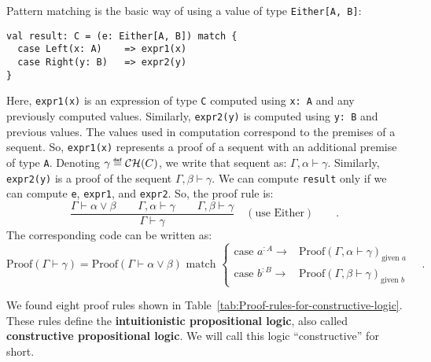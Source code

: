 Pattern matching is the basic way of using a value of type \lstinline!Either[A, B]!:
\begin{lstlisting}
val result: C = (e: Either[A, B]) match {
  case Left(x: A)    => expr1(x)
  case Right(y: B)   => expr2(y)
}
\end{lstlisting}
Here, \lstinline!expr1(x)! is an expression of type \lstinline!C!
computed using \lstinline!x: A! and any previously computed values.
Similarly, \lstinline!expr2(y)! is computed using \lstinline!y: B!
and previous values. The values used in computation correspond to
the premises of a sequent. So, \lstinline!expr1(x)! represents a
proof of a sequent with an additional premise of type \lstinline!A!.
Denoting $\gamma\triangleq{\cal CH}(C)$, we write that sequent as:
$\Gamma,\alpha\vdash\gamma$. Similarly, \lstinline!expr2(y)! is
a proof of the sequent $\Gamma,\beta\vdash\gamma$. We can compute
\lstinline!result! only if we can compute \lstinline!e!, \lstinline!expr1!,
and \lstinline!expr2!. So, the proof rule is: 
\[
\frac{\Gamma\vdash\alpha\vee\beta\quad\quad\Gamma,\alpha\vdash\gamma\quad\quad\Gamma,\beta\vdash\gamma}{\Gamma\vdash\gamma}\quad(\text{use Either})\quad\quad.
\]
The corresponding code can be written as:
\[
\text{Proof}\left(\Gamma\vdash\gamma\right)=\text{Proof}\left(\Gamma\vdash\alpha\vee\beta\right)\text{ match }\begin{cases}
\text{case }a^{:A}\rightarrow & \text{Proof}\left(\Gamma,\alpha\vdash\gamma\right)_{\text{given }a}\\
\text{case }b^{:B}\rightarrow & \text{Proof}\left(\Gamma,\beta\vdash\gamma\right)_{\text{given }b}
\end{cases}\quad.
\]

We found eight proof rules shown in Table~\ref{tab:Proof-rules-for-constructive-logic}.
These rules define the \textbf{intuitionistic
propositional logic}, also called \textbf{constructive
propositional logic}. We will call this logic \textsf{``}constructive\textsf{''} for
short.

